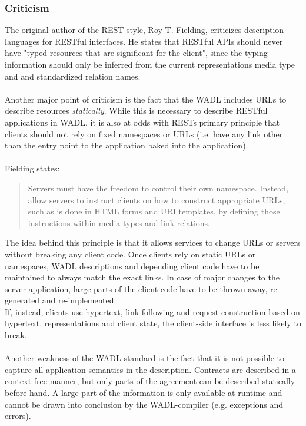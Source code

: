 \subsubsection*{Criticism}
The original author of the REST style, Roy T. Fielding, criticizes description languages for RESTful interfaces. He states that RESTful APIs should never have "typed resources that are significant for the client", since the typing information should only be inferred from the current representations media type and and standardized relation names.  \cite{FIELDBLOG}
\\ \\
Another major point of criticism is the fact that the WADL includes URLs to describe resources \emph{statically}. While this is necessary to describe RESTful applications in WADL, it is also at odds with RESTs primary principle that clients should not rely on fixed namespaces or URLs (i.e. have any link other than the entry point to the application baked into the application).
\\ \\
Fielding states:
\begin{quote}
Servers must have the freedom to control their own namespace. Instead, allow servers to instruct clients on how to construct appropriate URLs, such as is done in HTML forms and URI templates, by defining those instructions within media types and link relations. \cite{FIELDBLOG}
\end{quote}
The idea behind this principle is that it allows services to change URLs or servers without breaking any client code. Once clients rely on static URLs or namespaces, WADL descriptions and depending client code have to be maintained to always match the exact links. In case of major changes to the server application, large parts of the client code have to be thrown away, re-generated and re-implemented.
\\
If, instead, clients use hypertext, link following and request construction based on hypertext, representations and client state, the client-side interface is less likely to break. \cite{GREGBLOG}
\\ \\
Another weakness of the WADL standard is the fact that it is not possible to capture all application semantics in the description. Contracts are described in a context-free manner, but only parts of the agreement can be described statically before hand. A large part of the information is only available at runtime and cannot be drawn into conclusion by the WADL-compiler (e.g. exceptions and errors).